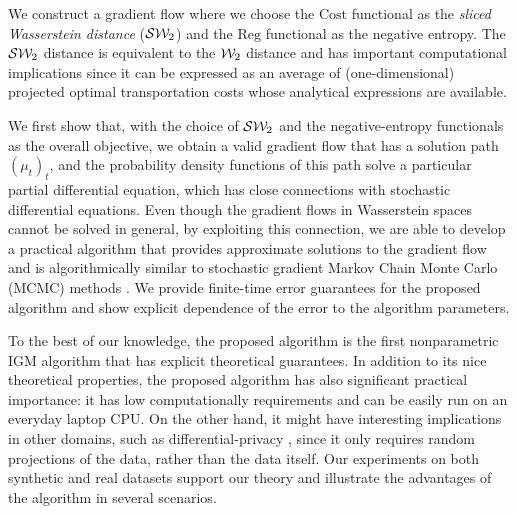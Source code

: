 We construct a gradient flow where we choose the $\mathrm{Cost}$ functional as the \textit{sliced Wasserstein distance} (${\cal S}{\cal W}_2$) \cite{bonneel2015sliced} and the $\mathrm{Reg}$ functional as the negative entropy. The ${\cal S}{\cal W}_2$ distance is equivalent to the ${\cal W}_2$ distance \cite{bonnotte2013unidimensional} and has important computational implications since it can be expressed as an average of (one-dimensional) projected optimal transportation costs whose analytical expressions are available.

We first show that, with the choice of ${\cal S}{\cal W}_2$ and the negative-entropy functionals as the overall objective, we obtain a valid gradient flow that has a solution path $(\mu_t)_t$, and the probability density functions of this path solve a particular partial differential equation, which has close connections with stochastic differential equations. Even though the gradient flows in Wasserstein spaces cannot be solved in general, by exploiting this connection, we are able to develop a practical algorithm that provides approximate solutions to the gradient flow and is algorithmically similar to stochastic gradient Markov Chain Monte Carlo (MCMC) methods \cite{WelTeh2011a,raginsky17a}. We provide finite-time error guarantees for the proposed algorithm and show explicit dependence of the error to the algorithm parameters.



To the best of our knowledge, the proposed algorithm is the first nonparametric IGM algorithm that has explicit theoretical guarantees. In addition to its nice theoretical properties, the proposed algorithm has also significant practical importance: it has low computationally requirements and can be easily run on an everyday laptop CPU. On the other hand, it might have interesting implications in other domains, such as differential-privacy \cite{dwork2014algorithmic}, since it only requires random projections of the data, rather than the data itself. Our experiments on both synthetic and real datasets support our theory and illustrate the advantages of the algorithm in several scenarios.







